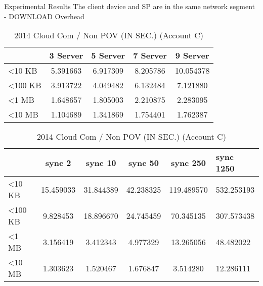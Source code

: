 \begin{frame}{Experimental Results}
{The client device and SP are in the same network segment - DOWNLOAD Overhead}
	\scriptsize
    \begin{table}[]
    \centering
    \caption{My Method / Non POV (IN SEC.) (Account C)}
    \begin{tabular}{lcccc}
                         & 3 Server & 5 Server & 7 Server & 9 Server  \\ \hline
        \textless 10 KB  & 5.391663 & 6.917309 & 8.205786 & 10.054378 \\ \hline
        \textless 100 KB & 3.913722 & 4.049482 & 6.132484 & 7.121880  \\ \hline
        \textless 1 MB   & 1.648657 & 1.805003 & 2.210875 & 2.283095  \\ \hline
        \textless 10 MB  & 1.104689 & 1.341869 & 1.754401 & 1.762387  \\ \hline
    \end{tabular}
    \caption{2014 Cloud Com / Non POV (IN SEC.) (Account C)}
    \begin{tabular}{lccccl}
                         & sync 2    & sync 10   & sync 50   & sync 250   & sync 1250  \\ \hline
        \textless 10 KB  & 15.459033 & 31.844389 & 42.238325 & 119.489570 & 532.253193 \\ \hline
        \textless 100 KB & 9.828453  & 18.896670 & 24.745459 & 70.345135  & 307.573438 \\ \hline
        \textless 1 MB   & 3.156419  & 3.412343  & 4.977329  & 13.265056  & 48.482022  \\ \hline
        \textless 10 MB  & 1.303623  & 1.520467  & 1.676847  & 3.514280   & 12.286111  \\ \hline
    \end{tabular}
    \end{table}
\end{frame}

